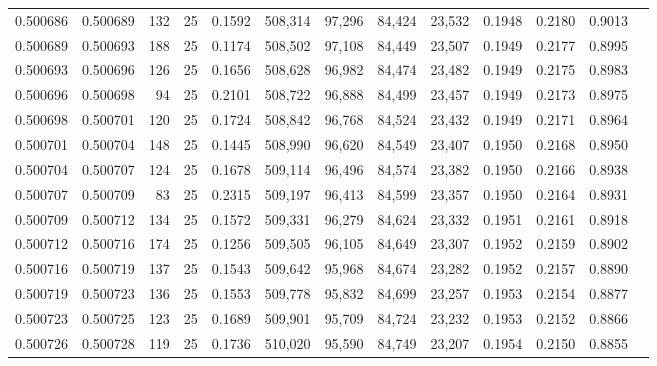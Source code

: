 \begin{tabular}{rrrrrrrrrrrrr}
0.500686 & 0.500689 & 132 &  25 &                                     0.1592 & 508,314 &  97,296 &  84,424 &  23,532 & 0.1948 & 0.2180 & 0.9013 \\
0.500689 & 0.500693 & 188 &  25 &                                     0.1174 & 508,502 &  97,108 &  84,449 &  23,507 & 0.1949 & 0.2177 & 0.8995 \\
0.500693 & 0.500696 & 126 &  25 &                                     0.1656 & 508,628 &  96,982 &  84,474 &  23,482 & 0.1949 & 0.2175 & 0.8983 \\
0.500696 & 0.500698 &  94 &  25 &                                     0.2101 & 508,722 &  96,888 &  84,499 &  23,457 & 0.1949 & 0.2173 & 0.8975 \\
0.500698 & 0.500701 & 120 &  25 &                                     0.1724 & 508,842 &  96,768 &  84,524 &  23,432 & 0.1949 & 0.2171 & 0.8964 \\
0.500701 & 0.500704 & 148 &  25 &                                     0.1445 & 508,990 &  96,620 &  84,549 &  23,407 & 0.1950 & 0.2168 & 0.8950 \\
0.500704 & 0.500707 & 124 &  25 &                                     0.1678 & 509,114 &  96,496 &  84,574 &  23,382 & 0.1950 & 0.2166 & 0.8938 \\
0.500707 & 0.500709 &  83 &  25 &                                     0.2315 & 509,197 &  96,413 &  84,599 &  23,357 & 0.1950 & 0.2164 & 0.8931 \\
0.500709 & 0.500712 & 134 &  25 &                                     0.1572 & 509,331 &  96,279 &  84,624 &  23,332 & 0.1951 & 0.2161 & 0.8918 \\
0.500712 & 0.500716 & 174 &  25 &                                     0.1256 & 509,505 &  96,105 &  84,649 &  23,307 & 0.1952 & 0.2159 & 0.8902 \\
0.500716 & 0.500719 & 137 &  25 &                                     0.1543 & 509,642 &  95,968 &  84,674 &  23,282 & 0.1952 & 0.2157 & 0.8890 \\
0.500719 & 0.500723 & 136 &  25 &                                     0.1553 & 509,778 &  95,832 &  84,699 &  23,257 & 0.1953 & 0.2154 & 0.8877 \\
0.500723 & 0.500725 & 123 &  25 &                                     0.1689 & 509,901 &  95,709 &  84,724 &  23,232 & 0.1953 & 0.2152 & 0.8866 \\
0.500726 & 0.500728 & 119 &  25 &                                     0.1736 & 510,020 &  95,590 &  84,749 &  23,207 & 0.1954 & 0.2150 & 0.8855 \\

\end{tabular}
